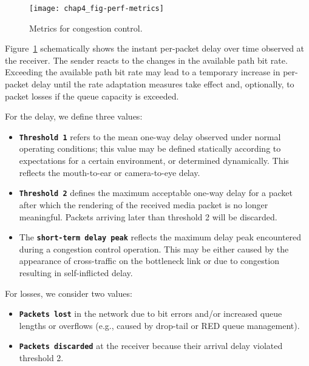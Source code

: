 


\begin{figure}
\centering
\texttt{[image: chap4\_fig-perf-metrics]}
\caption{Metrics for congestion control.}
\label{fig:4:rc_model}
\end{figure}

Figure~\ref{fig:4:rc_model} schematically shows the instant per-packet delay
over time observed at the receiver. The sender reacts to the changes in the
available path bit rate. Exceeding the available path bit rate may lead to a
temporary increase in per-packet delay until the rate adaptation measures take
effect and, optionally, to packet losses if the queue capacity is exceeded.

For the delay, we define three values:
\begin{itemize}
\setlength{\itemsep}{0pt}

\item \textbf{\texttt{Threshold 1}} refers to the mean one-way delay observed
under normal operating conditions; this value may be defined statically
according to expectations for a certain environment, or determined
dynamically. This reflects the mouth-to-ear or camera-to-eye delay.

\item \textbf{\texttt{Threshold 2}} defines the maximum acceptable one-way
delay for a packet after which the rendering of the received media packet is
no longer meaningful. Packets arriving later than threshold 2 will be
discarded.


\item The \textbf{\texttt{short-term delay peak}} reflects the maximum delay
peak encountered during a congestion control operation. This may be either
caused by the appearance of cross-traffic on the bottleneck link or due to
congestion resulting in self-inflicted delay.

\end{itemize}

For losses, we consider two values:
\begin{itemize}
\setlength{\itemsep}{0pt}

\item \textbf{\texttt{Packets lost}} in the network due to bit errors and/or
increased queue lengths or overflows (e.g., caused by drop-tail or RED queue
management).

\item \textbf{\texttt{Packets discarded}} at the receiver because their
arrival delay violated threshold 2.

\end{itemize}

